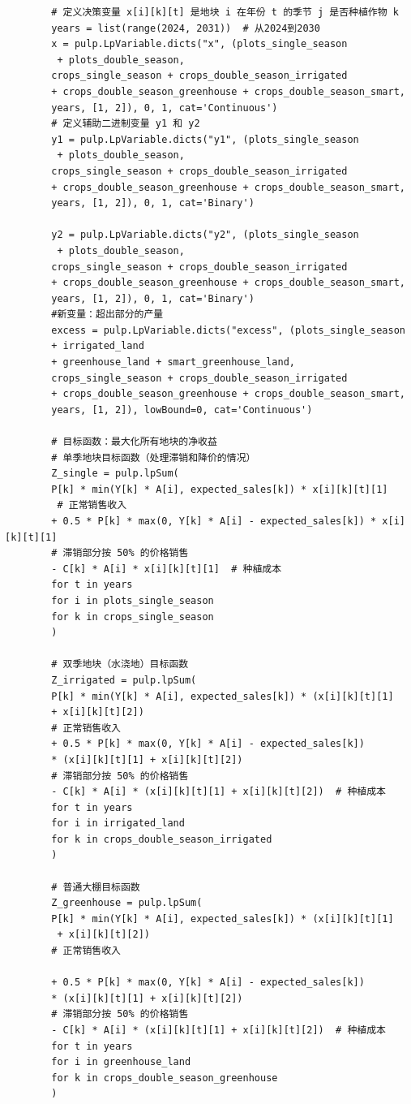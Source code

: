 \documentclass[12pt]{ctexart}
\begin{document}
\begin{verbatim}
		# 定义决策变量 x[i][k][t] 是地块 i 在年份 t 的季节 j 是否种植作物 k
		years = list(range(2024, 2031))  # 从2024到2030
		x = pulp.LpVariable.dicts("x", (plots_single_season
		 + plots_double_season,
		crops_single_season + crops_double_season_irrigated 
		+ crops_double_season_greenhouse + crops_double_season_smart,
		years, [1, 2]), 0, 1, cat='Continuous')
		# 定义辅助二进制变量 y1 和 y2
		y1 = pulp.LpVariable.dicts("y1", (plots_single_season
		 + plots_double_season,
		crops_single_season + crops_double_season_irrigated
		+ crops_double_season_greenhouse + crops_double_season_smart,
		years, [1, 2]), 0, 1, cat='Binary')
		
		y2 = pulp.LpVariable.dicts("y2", (plots_single_season
		 + plots_double_season,
		crops_single_season + crops_double_season_irrigated 
		+ crops_double_season_greenhouse + crops_double_season_smart,
		years, [1, 2]), 0, 1, cat='Binary')
		#新变量：超出部分的产量
		excess = pulp.LpVariable.dicts("excess", (plots_single_season 
		+ irrigated_land
		+ greenhouse_land + smart_greenhouse_land,
		crops_single_season + crops_double_season_irrigated 
		+ crops_double_season_greenhouse + crops_double_season_smart,
		years, [1, 2]), lowBound=0, cat='Continuous')
		
		# 目标函数：最大化所有地块的净收益
		# 单季地块目标函数（处理滞销和降价的情况）
		Z_single = pulp.lpSum(
		P[k] * min(Y[k] * A[i], expected_sales[k]) * x[i][k][t][1] 
		 # 正常销售收入
		+ 0.5 * P[k] * max(0, Y[k] * A[i] - expected_sales[k]) * x[i][k][t][1] 
		# 滞销部分按 50% 的价格销售
		- C[k] * A[i] * x[i][k][t][1]  # 种植成本
		for t in years 
		for i in plots_single_season 
		for k in crops_single_season
		)
		
		# 双季地块（水浇地）目标函数
		Z_irrigated = pulp.lpSum(
		P[k] * min(Y[k] * A[i], expected_sales[k]) * (x[i][k][t][1] 
		+ x[i][k][t][2])
		# 正常销售收入
		+ 0.5 * P[k] * max(0, Y[k] * A[i] - expected_sales[k]) 
		* (x[i][k][t][1] + x[i][k][t][2]) 
		# 滞销部分按 50% 的价格销售
		- C[k] * A[i] * (x[i][k][t][1] + x[i][k][t][2])  # 种植成本
		for t in years
		for i in irrigated_land
		for k in crops_double_season_irrigated
		)
		
		# 普通大棚目标函数
		Z_greenhouse = pulp.lpSum(
		P[k] * min(Y[k] * A[i], expected_sales[k]) * (x[i][k][t][1]
		 + x[i][k][t][2])  
		# 正常销售收入
		
		+ 0.5 * P[k] * max(0, Y[k] * A[i] - expected_sales[k]) 
		* (x[i][k][t][1] + x[i][k][t][2]) 
		# 滞销部分按 50% 的价格销售
		- C[k] * A[i] * (x[i][k][t][1] + x[i][k][t][2])  # 种植成本
		for t in years
		for i in greenhouse_land
		for k in crops_double_season_greenhouse
		)
		

\end{verbatim}
\end{document}
